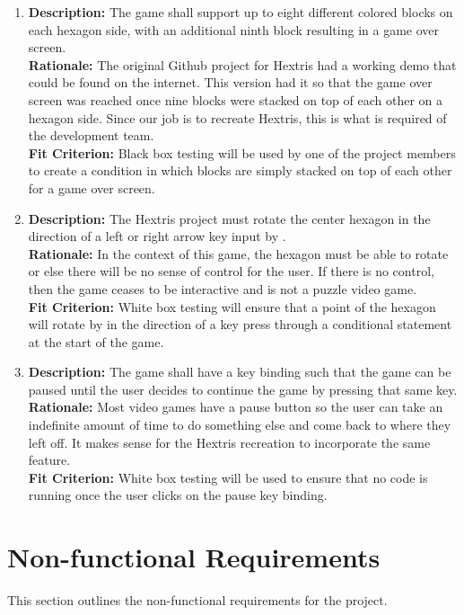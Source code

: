 \documentclass[12pt, titlepage]{article}
\begin{document}
\begin{enumerate}[label=F\arabic*]
\item \textbf{Description:} The game shall support up to eight different colored blocks on each hexagon side, with an additional ninth block resulting in a game over screen. \\
\textbf{Rationale:} The original Github project for Hextris had a working demo that could be found on the internet. This version had it so that the game over screen was reached once nine blocks were stacked on top of each other on a hexagon side. Since our job is to recreate Hextris, this is what is required of the development team. \\
\textbf{Fit Criterion:} Black box testing will be used by one of the project members to create a condition in which blocks are simply stacked on top of each other for a game over screen. 

\item \textbf{Description:} The Hextris project must rotate the center hexagon in the direction of a left or right arrow key input by \textepsilon. \\
\textbf{Rationale:} In the context of this game, the hexagon must be able to rotate or else there will be no sense of control for the user. If there is no control, then the game ceases to be interactive and is not a puzzle video game. \\
\textbf{Fit Criterion:} White box testing will ensure that a point of the hexagon will rotate by \textepsilon \space in the direction of a key press through a conditional statement at the start of the game. 

\item \textbf{Description:} The game shall have a key binding such that the game can be paused until the user decides to continue the game by pressing that same key.\\
\textbf{Rationale:} Most video games have a pause button so the user can take an indefinite amount of time to do something else and come back to where they left off. It makes sense for the Hextris recreation to incorporate the same feature. \\
\textbf{Fit Criterion:} White box testing will be used to ensure that no code is running once the user clicks on the pause key binding. 


\end{enumerate}


\section{Non-functional Requirements}
This section outlines the non-functional requirements for the project.
\end{document}
